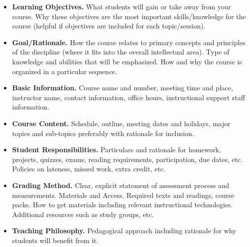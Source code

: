 \begin{itemize}
\item \textbf{Learning Objectives.} What students will gain or take away from your course. Why these objectives are the most important skills/knowledge for the course (helpful if objectives are included for each topic/session).
  
\item \textbf{Goal/Rationale.} How the course relates to primary concepts and principles of the discipline (where it fits into the overall intellectual area). Type of knowledge and abilities that will be emphasized. How and why the course is organized in a particular sequence.

\item \textbf{Basic Information.} Course name and number, meeting time and place, instructor name, contact information, office hours, instructional support staff information.

\item \textbf{Course Content.} Schedule, outline, meeting dates and holidays, major topics and sub-topics preferably with rationale for inclusion.
  
\item \textbf{Student Responsibilities.} Particulars and rationale for homework, projects, quizzes, exams, reading requirements, participation, due dates, etc. Policies on lateness, missed work, extra credit, etc.

\item \textbf{Grading Method.} Clear, explicit statement of assessment process and measurements.
  Materials and Access. Required texts and readings, course packs. How to get materials including relevant instructional technologies. Additional resources such as study groups, etc.
  
\item \textbf{Teaching Philosophy.} Pedagogical approach including rationale for why students will benefit from it.
\end{itemize}


